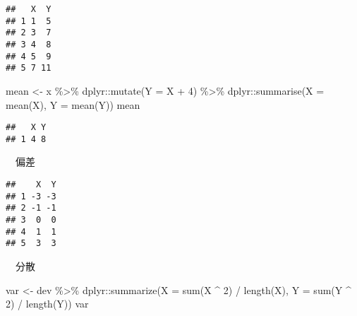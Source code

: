 \documentclass[
  12pt,
]{book}
\newenvironment{Shaded}{\begin{snugshade}}{\end{snugshade}}
\newcommand{\AttributeTok}[1]{\textcolor[rgb]{0.77,0.63,0.00}{#1}}
\newcommand{\DecValTok}[1]{\textcolor[rgb]{0.00,0.00,0.81}{#1}}
\newcommand{\FunctionTok}[1]{\textcolor[rgb]{0.00,0.00,0.00}{#1}}
\newcommand{\NormalTok}[1]{#1}
\newcommand{\OtherTok}[1]{\textcolor[rgb]{0.56,0.35,0.01}{#1}}
\newcommand{\SpecialCharTok}[1]{\textcolor[rgb]{0.00,0.00,0.00}{#1}}
\begin{document}
\begin{verbatim}
##   X  Y
## 1 1  5
## 2 3  7
## 3 4  8
## 4 5  9
## 5 7 11
\end{verbatim}

\begin{Shaded}
\begin{Highlighting}[]
\NormalTok{mean }\OtherTok{\textless{}{-}}\NormalTok{ x }\SpecialCharTok{\%\textgreater{}\%} 
\NormalTok{  dplyr}\SpecialCharTok{::}\FunctionTok{mutate}\NormalTok{(}\AttributeTok{Y =}\NormalTok{ X }\SpecialCharTok{+} \DecValTok{4}\NormalTok{) }\SpecialCharTok{\%\textgreater{}\%} 
\NormalTok{  dplyr}\SpecialCharTok{::}\FunctionTok{summarise}\NormalTok{(}\AttributeTok{X =} \FunctionTok{mean}\NormalTok{(X), }\AttributeTok{Y =} \FunctionTok{mean}\NormalTok{(Y))}
\NormalTok{mean}
\end{Highlighting}
\end{Shaded}

\begin{verbatim}
##   X Y
## 1 4 8
\end{verbatim}

　偏差

\begin{Shaded}
\end{Shaded}

\begin{verbatim}
##    X  Y
## 1 -3 -3
## 2 -1 -1
## 3  0  0
## 4  1  1
## 5  3  3
\end{verbatim}

　分散

\begin{Shaded}
\begin{Highlighting}[]
\NormalTok{var }\OtherTok{\textless{}{-}}\NormalTok{ dev }\SpecialCharTok{\%\textgreater{}\%} 
\NormalTok{  dplyr}\SpecialCharTok{::}\FunctionTok{summarize}\NormalTok{(}\AttributeTok{X =} \FunctionTok{sum}\NormalTok{(X }\SpecialCharTok{\^{}} \DecValTok{2}\NormalTok{) }\SpecialCharTok{/} \FunctionTok{length}\NormalTok{(X), }\AttributeTok{Y =} \FunctionTok{sum}\NormalTok{(Y }\SpecialCharTok{\^{}} \DecValTok{2}\NormalTok{) }\SpecialCharTok{/} \FunctionTok{length}\NormalTok{(Y))}
\NormalTok{var}
\end{Highlighting}
\end{Shaded}
\end{document}
